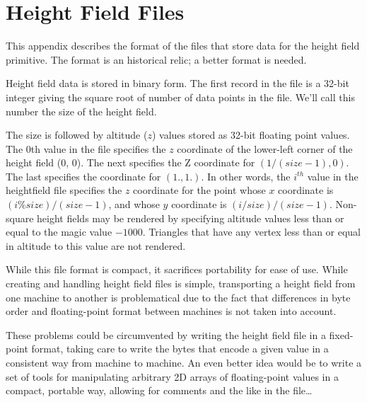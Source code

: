 \chapter{Height Field Files}

This appendix describes the format of the files that store data
for the height field primitive.
The format is an historical relic; a better format is needed.

Height field data is stored in binary form.
The first record in the file is a
32-bit integer giving the square root of number of data
points in the file.
We'll call this number
the size of the height field.

The size is
followed by altitude ($z$) values stored as 32-bit
floating point values.  The 0th value in the file specifies the $z$
coordinate
of the lower-left corner of the height field (0, 0).
The next
specifies the Z coordinate for $(1/(size-1), 0)$.  The last specifies the
coordinate for $(1., 1.)$.  In other words, the $i^{th}$ value 
in the heightfield file specifies the $z$ coordinate for the point
whose $x$ coordinate is
$(i \% size) / (size -1)$, and whose
$y$ coordinate is $(i / size) / (size -1)$.
Non-square height fields may be rendered by specifying altitude values
less than or equal to the magic value
$-1000$.  Triangles that have any vertex less than
or equal in altitude to this value are not rendered.

While this file format is compact, it sacrifices portability for
ease of use.  While creating and handling height field files is
simple, transporting a height field from one machine to another
is problematical due to the fact that differences in byte order
and floating-point format between machines is not taken into
account.

These problems could be circumvented by writing the height field file
in a fixed-point format, taking care to write the bytes that
encode a given value in a consistent way from machine to machine.
An even better idea would be to write a set of tools for
manipulating arbitrary 2D arrays of floating-point values in a compact,
portable way, allowing for comments and the like in the file\ldots
